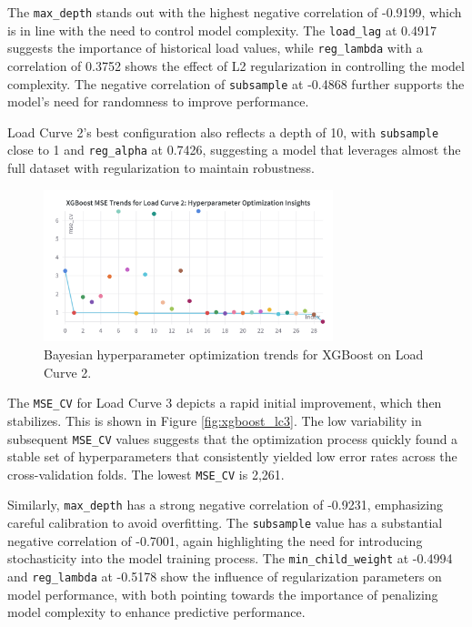 \documentclass{article} %
\begin{document}
The \texttt{max\_depth} stands out with the highest negative correlation of -0.9199, which is in line with the need to control model complexity. The \texttt{load\_lag} at 0.4917 suggests the importance of historical load values, while \texttt{reg\_lambda} with a correlation of 0.3752 shows the effect of L2 regularization in controlling the model complexity. The negative correlation of \texttt{subsample} at -0.4868 further supports the model's need for randomness to improve performance.

Load Curve 2's best configuration also reflects a depth of 10, with \texttt{subsample} close to 1 and \texttt{reg\_alpha} at 0.7426, suggesting a model that leverages almost the full dataset with regularization to maintain robustness.
\begin{figure}[H]
    \centering
    \includegraphics[width=0.75\textwidth]{ressources/Hyperparams/XGBoost/XGBoost MSE Trends for Load Curve 2 Hyperparameter Optimization Insights.png}
    \caption{Bayesian hyperparameter optimization trends for XGBoost on Load Curve 2.}
    \label{fig:xgboost_lc2}
\end{figure}
The \texttt{MSE\_CV} for Load Curve 3 depicts a rapid initial improvement, which then stabilizes. This is shown in Figure \ref{fig:xgboost_lc3}. The low variability in subsequent \texttt{MSE\_CV} values suggests that the optimization process quickly found a stable set of hyperparameters that consistently yielded low error rates across the cross-validation folds. The lowest \texttt{MSE\_CV} is 2,261.

Similarly, \texttt{max\_depth} has a strong negative correlation of -0.9231, emphasizing careful calibration to avoid overfitting. The \texttt{subsample} value has a substantial negative correlation of -0.7001, again highlighting the need for introducing stochasticity into the model training process. The \texttt{min\_child\_weight} at -0.4994 and \texttt{reg\_lambda} at -0.5178 show the influence of regularization parameters on model performance, with both pointing towards the importance of penalizing model complexity to enhance predictive performance.
\end{document}
